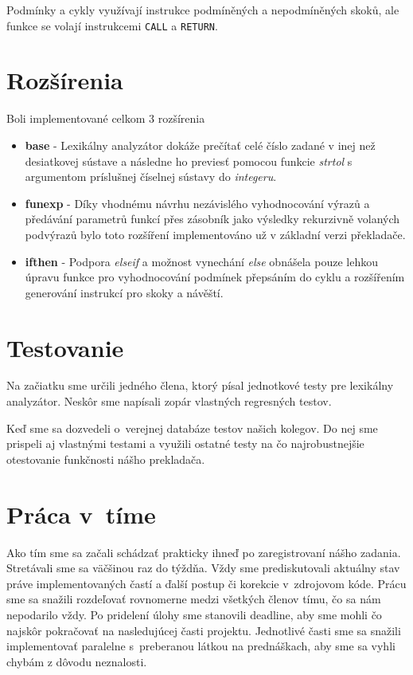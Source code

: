 \documentclass{article}
\begin{document}
            Podmínky a cykly využívají instrukce podmíněných a nepodmíněných skoků, ale funkce se volají instrukcemi \texttt{CALL}
            a \texttt{RETURN}.
        
    \section{Rozšírenia}
    Boli implementované celkom 3 rozšírenia
        \begin{itemize}
            \item \textbf{base}   - Lexikálny analyzátor dokáže prečítať celé číslo zadané v inej než
                                    desiatkovej sústave a následne ho previesť pomocou funkcie 
                                    \emph{strtol} s argumentom príslušnej číselnej sústavy do \emph{integeru}.
            \item \textbf{funexp} - Díky vhodnému návrhu nezávislého vyhodnocování výrazů a předávání parametrů funkcí
                                    přes zásobník jako výsledky rekurzivně volaných podvýrazů bylo toto rozšíření implementováno
                                    už v základní verzi překladače.
            \item \textbf{ifthen} - Podpora \emph{elseif} a možnost vynechání \emph{else} obnášela pouze lehkou úpravu funkce
                                    pro vyhodnocování podmínek přepsáním do cyklu a rozšířením generování instrukcí
                                    pro skoky a návěští.
        \end{itemize}
    
    \section{Testovanie}
    Na začiatku sme určili jedného člena, ktorý písal jednotkové testy pre lexikálny analyzátor. 
    Neskôr sme napísali zopár vlastných regresných testov.
    
    Keď sme sa dozvedeli o~verejnej databáze testov našich kolegov. Do nej sme prispeli aj vlastnými testami a využili ostatné testy na čo najrobustnejšie otestovanie funkčnosti nášho prekladača.
    
    \section{Práca v~tíme}
    Ako tím sme sa začali schádzať prakticky ihneď po zaregistrovaní nášho zadania. Stretávali sme sa 
    väčšinou raz do týždňa. Vždy sme prediskutovali aktuálny stav práve implementovaných častí 
    a ďalší postup či korekcie v~zdrojovom kóde. Prácu sme sa snažili rozdeľovať rovnomerne medzi 
    všetkých členov tímu, čo sa nám nepodarilo vždy. Po pridelení úlohy sme stanovili deadline, aby sme 
    mohli čo najskôr pokračovať na nasledujúcej časti projektu. Jednotlivé časti sme sa snažili 
    implementovať paralelne s~preberanou látkou na prednáškach, aby sme sa vyhli chybám z dôvodu neznalosti.
\end{document}
